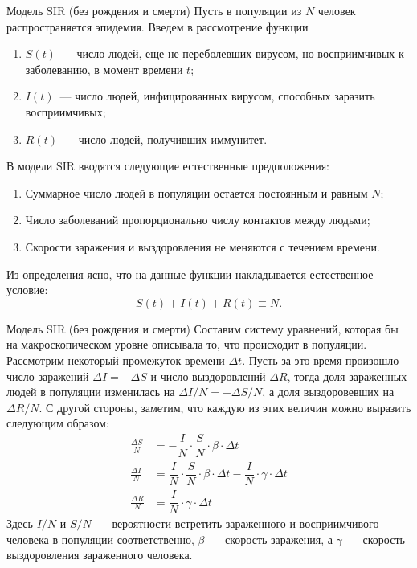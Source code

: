 \documentclass[aspectratio=169]{beamer}
\begin{document}
\begin{frame}[noframenumbering,plain]
	\titlepage
\end{frame}
\begin{frame}{Модель SIR (без рождения и смерти)}
    Пусть в популяции из $N$ человек распространяется эпидемия. Введем в рассмотрение функции
    \begin{enumerate}
        \item $S(t)$~--- число людей, еще не переболевших вирусом, но восприимчивых к заболеванию, в момент времени $t$;
        \item $I(t)$~--- число людей, инфицированных вирусом, способных заразить восприимчивых;
        \item $R(t)$~--- число людей, получивших иммунитет.
    \end{enumerate}
    В модели SIR вводятся следующие естественные предположения:
    \begin{enumerate}
        \item Суммарное число людей в популяции остается постоянным и равным $N$;
        \item Число заболеваний пропорционально числу контактов между людьми;
        \item Скорости заражения и выздоровления не меняются с течением времени.
    \end{enumerate}
    Из определения ясно, что на данные функции накладывается естественное условие:
    \[
        S(t) + I(t) + R(t) \equiv N.
    \]
\end{frame}
\begin{frame}{Модель SIR (без рождения и смерти)}
    Составим систему уравнений, которая бы на макроскопическом уровне описывала то, что происходит в популяции. Рассмотрим некоторый промежуток времени $\Delta t$. Пусть за это время произошло число заражений $\Delta I = - \Delta S$ и число выздоровлений $\Delta R$, тогда доля зараженных людей в популяции изменилась на $\Delta I / N = - \Delta S / N$, а доля выздоровевших на $\Delta R / N$. С другой стороны, заметим, что каждую из этих величин можно выразить следующим образом:
    \begin{align*}
        \frac{\Delta S}{N} &= - \dfrac{I}{N} \cdot \dfrac{S}{N} \cdot \beta \cdot \Delta t \\
        \frac{\Delta I}{N} &= \dfrac{I}{N} \cdot \dfrac{S}{N} \cdot \beta \cdot \Delta t - \dfrac{I}{N} \cdot \gamma \cdot \Delta t \\
        \frac{\Delta R}{N} &= \dfrac{I}{N} \cdot \gamma \cdot \Delta t
    \end{align*}
    Здесь $I/N$ и $S/N$~--- вероятности встретить зараженного и восприимчивого человека в популяции соответственно, $\beta$~--- скорость заражения, а $\gamma$~--- скорость выздоровления зараженного человека.
\end{frame}
\end{document}
